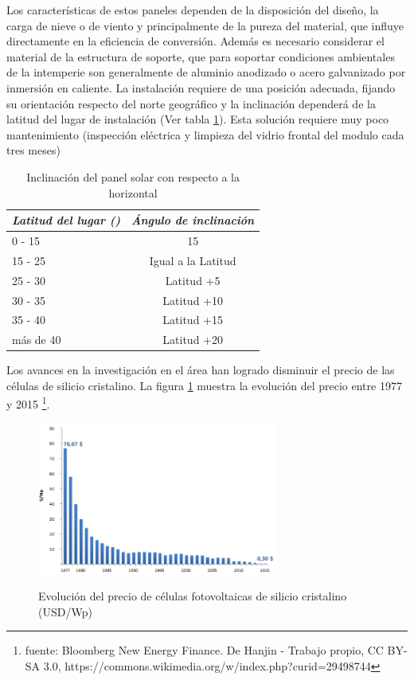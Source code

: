 Los características de estos paneles dependen de la disposición del diseño, la carga de nieve o de viento y principalmente de la pureza del material, que influye directamente en la eficiencia de conversión. Además es necesario considerar el material de la estructura de soporte, que para soportar condiciones ambientales de la intemperie son generalmente de aluminio anodizado o acero galvanizado por inmersión en caliente. La instalación requiere de una posición adecuada, fijando su orientación respecto del norte geográfico y la inclinación dependerá de la latitud del lugar de instalación (Ver tabla \ref{tab:inclina}). Esta solución requiere muy poco mantenimiento (inspección eléctrica y limpieza del vidrio frontal del modulo cada tres meses)

\begin{table}[ht]
	\centering
	\caption{Inclinación del panel solar con respecto a la horizontal}
	\begin{tabular}{@{} l *1c @{}}    \toprule
		\emph{\textbf{Latitud del lugar (\grados)}} & \emph{\textbf{Ángulo de inclinación}}\\
		\midrule
		0 - 15	& 15\grados	\\	
		15 - 25 	& Igual a la Latitud\\
		25 - 30	& Latitud +5\grados\\
		30 - 35	& Latitud +10\grados\\
		35 - 40	& Latitud +15\grados\\
		más de 40	& Latitud +20\grados\\
		\bottomrule
		\hline
	\end{tabular}
	\label{tab:inclina}
\end{table}

Los avances en la investigación en el área han logrado disminuir el precio de las células de silicio cristalino. La figura \ref{fig:swanson} muestra la evolución del precio entre 1977 y 2015 \footnote{fuente: Bloomberg New Energy Finance. De Hanjin - Trabajo propio, CC BY-SA 3.0, https://commons.wikimedia.org/w/index.php?curid=29498744}.


\begin{figure}[h!]
	\centering
    \includegraphics[width=0.7\textwidth]{./Figures/SwansonEffect.png}
	\label{fig:swanson}
	\caption{Evolución del precio de células fotovoltaicas de silicio cristalino (USD/Wp)}
\end{figure}

